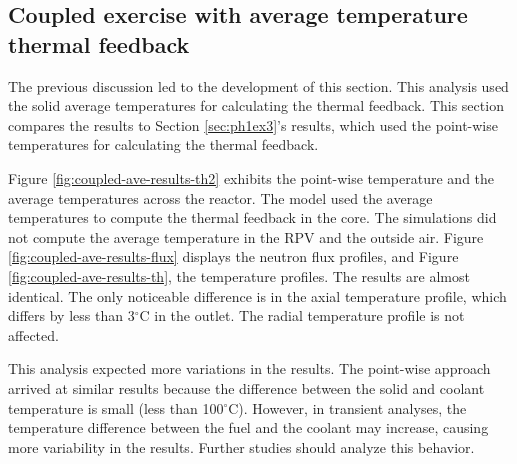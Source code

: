 \subsection{Coupled exercise with average temperature thermal feedback}
\label{sec:coupled-average}

The previous discussion led to the development of this section.
This analysis used the solid average temperatures for calculating the thermal feedback.
This section compares the results to Section \ref{sec:ph1ex3}'s results, which used the point-wise temperatures for calculating the thermal feedback.

Figure \ref{fig:coupled-ave-results-th2} exhibits the point-wise temperature and the average temperatures across the reactor.
The model used the average temperatures to compute the thermal feedback in the core.
The simulations did not compute the average temperature in the RPV and the outside air.
Figure \ref{fig:coupled-ave-results-flux} displays the neutron flux profiles, and Figure \ref{fig:coupled-ave-results-th}, the temperature profiles.
The results are almost identical.
The only noticeable difference is in the axial temperature profile, which differs by less than 3$^{\circ}$C in the outlet.
The radial temperature profile is not affected.

This analysis expected more variations in the results.
The point-wise approach arrived at similar results because the difference between the solid and coolant temperature is small (less than 100$^{\circ}$C).
However, in transient analyses, the temperature difference between the fuel and the coolant may increase, causing more variability in the results.
Further studies should analyze this behavior.

